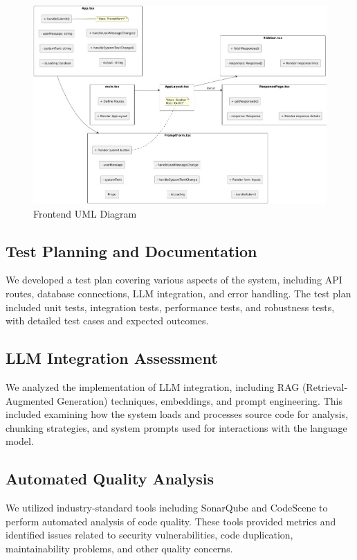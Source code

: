 \documentclass[sigconf]{acmart}
\begin{document}
\begin{figure}[htbp]
    \centering
    \includegraphics[width=1\linewidth]{FrontUML.jpg}
    \caption{Frontend UML Diagram}
    \label{fig:figure2}
\end{figure}

\subsection{Test Planning and Documentation}
We developed a test plan covering various aspects of the system, including API routes, database connections, LLM integration, and error handling. The test plan included unit tests, integration tests, performance tests, and robustness tests, with detailed test cases and expected outcomes.

\subsection{LLM Integration Assessment}
We analyzed the implementation of LLM integration, including RAG (Retrieval-Augmented Generation) techniques, embeddings, and prompt engineering. This included examining how the system loads and processes source code for analysis, chunking strategies, and system prompts used for interactions with the language model.

\subsection{Automated Quality Analysis}
We utilized industry-standard tools including SonarQube and CodeScene to perform automated analysis of code quality. These tools provided metrics and identified issues related to security vulnerabilities, code duplication, maintainability problems, and other quality concerns.
\end{document}

